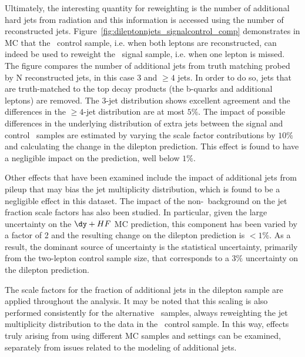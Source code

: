 Ultimately, the interesting quantity for reweighting is the number of
additional hard jets from radiation and this information is accessed using the
number of reconstructed
jets. Figure~\ref{fig:dileptonnjets_signalcontrol_comp} 
demonstrates in MC that the \ttll\ control sample, i.e. when both leptons are reconstructed,
can indeed be used to reweight the \ttll\ signal sample, i.e. when one lepton is missed.
The figure compares the
number of additional jets from truth matching probed by N
reconstructed jets, in this case 3 and $\ge4$ jets. In order to do so,
jets that are truth-matched to the top decay products (the b-quarks
and additional leptons) are removed. The 3-jet distribution shows 
excellent agreement and the differences in the $\ge4$-jet distribution 
are at most $5\%$. The impact of possible differences in the
underlying distribution of extra
jets between the signal and control \ttll\ samples are estimated by
varying the scale factor contributions by $10\%$ and calculating the
change in the dilepton prediction. This effect is found to have a
negligible impact on the prediction, well below $1\%$.

Other effects that have been examined include the impact of 
additional jets from pileup that may bias the jet multiplicity
distribution, which  is found to be a negligible effect in this dataset. The
impact of the non-\ttll\ background on the jet fraction scale factors
has also been studied. In particular, given the large uncertainty on
the $\dy+HF$ MC prediction, this component has been varied by a factor
of 2 and the resulting change on the dilepton prediction is $<1\%$. As
a result, the dominant source of uncertainty is the statistical
uncertainty, primarily from the two-lepton control sample size, that
corresponds to a $3\%$ uncertainty on the dilepton prediction. 

The scale factors for the fraction of additional jets in the dilepton
sample are applied throughout the analysis. It may be noted that this
scaling is also performed consistently for the alternative \ttbar\
samples, always reweighting the jet multiplicity distribution to the
data in the \ttll\ control sample. In this way, effects truly
arising from using different MC samples and settings can be examined,
separately from issues related to the modeling of additional jets. 


